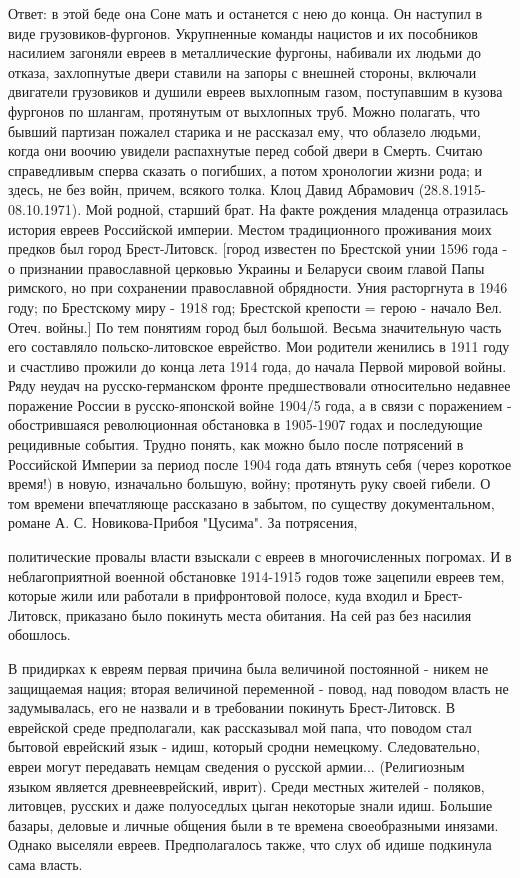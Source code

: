 Ответ: в этой беде она Соне мать и останется с нею до конца. Он наступил в виде грузовиков-фургонов. Укрупненные команды нацистов и их пособников насилием загоняли евреев в металлические фургоны, набивали их людьми до отказа, захлопнутые двери ставили на запоры с внешней стороны, включали двигатели грузовиков и душили евреев выхлопным газом, поступавшим в кузова фургонов по шлангам, протянутым от выхлопных труб. Можно полагать, что бывший партизан пожалел старика и не рассказал ему, что облазело людьми, когда они воочию увидели распахнутые перед собой двери в Смерть. Считаю справедливым сперва сказать о погибших, а потом хронологии жизни рода; и здесь,
\clearpage
не без войн, причем, всякого толка.
Клоц Давид Абрамович (28.8.1915-08.10.1971). Мой родной, старший брат. На факте рождения младенца отразилась история евреев Российской империи. Местом традиционного проживания моих предков был город Брест-Литовск. [город известен по Брестской унии 1596 года - о признании православной церковью Украины и Беларуси своим главой Папы римского, но при сохранении православной обрядности. Уния расторгнута в 1946 году; по Брестскому миру - 1918 год; Брестской крепости = герою - начало Вел. Отеч. войны.]
По тем понятиям город был большой. Весьма значительную часть его составляло польско-литовское еврейство. Мои родители женились в 1911 году и счастливо прожили до конца лета 1914 года, до начала Первой мировой войны.
Ряду неудач на русско-германском фронте предшествовали относительно недавнее поражение России в русско-японской войне 1904/5 года, а в связи с поражением - обострившаяся революционная обстановка в 1905-1907 годах и последующие рецидивные события.
Трудно понять, как можно было после потрясений в Российской Империи за период после 1904 года дать втянуть себя (через короткое время!) в новую, изначально большую, войну; протянуть руку своей гибели. О том времени впечатляюще рассказано в забытом, по существу документальном, романе А. С. Новикова-Прибоя "Цусима". За потрясения,

политические провалы власти взыскали с евреев в многочисленных погромах. И в неблагоприятной военной обстановке 1914-1915 годов тоже зацепили евреев тем, которые жили или работали в прифронтовой полосе, куда входил и Брест-Литовск, приказано было покинуть места обитания. На сей раз без насилия обошлось.

В придирках к евреям первая причина была величиной постоянной - никем не защищаемая нация; вторая величиной переменной - повод, над поводом власть не задумывалась, его не назвали и в требовании покинуть Брест-Литовск. В еврейской среде предполагали, как рассказывал мой папа, что поводом стал бытовой еврейский язык - идиш, который сродни немецкому. Следовательно, евреи могут передавать немцам сведения о русской армии... (Религиозным языком является древнееврейский, иврит). Среди местных жителей - поляков, литовцев, русских и даже полуоседлых цыган некоторые знали идиш. Большие базары, деловые и личные общения были в те времена своеобразными инязами. Однако выселяли евреев. Предполагалось также, что слух об идише подкинула сама власть.

